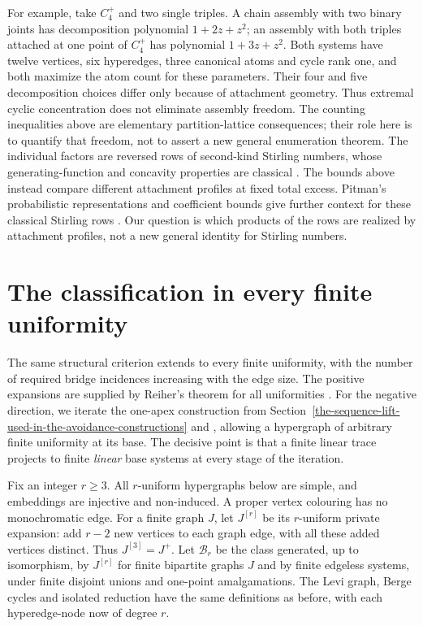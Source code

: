 \documentclass[a4paper,11pt,reqno]{amsart}
\theoremstyle{plain}
\theoremstyle{definition}
\theoremstyle{remark}
\begin{document}
For example, take $C_4^+$ and two single triples.  A chain assembly with two
binary joints has decomposition polynomial $1+2z+z^2$; an assembly with both
triples attached at one point of $C_4^+$ has polynomial $1+3z+z^2$.
Both systems have twelve vertices, six hyperedges, three canonical atoms
and cycle rank one, and both maximize the atom count for these parameters.
Their four and five decomposition choices differ only because of attachment
geometry.  Thus extremal cyclic concentration does not eliminate assembly
freedom.  The counting inequalities above are elementary partition-lattice
consequences; their role here is to quantify that freedom, not to assert a
new general enumeration theorem.
The individual factors are reversed rows of second-kind Stirling numbers,
whose generating-function and concavity properties are classical
\citep{lieb1968}.  The bounds above instead compare different attachment
profiles at fixed total excess.
Pitman's probabilistic representations and coefficient bounds give further
context for these classical Stirling rows \citep{pitman1997}.  Our question
is which products of the rows are realized by attachment profiles, not a
new general identity for Stirling numbers.

\section{The classification in every finite uniformity}
\label{uniform-extension}

The same structural criterion extends to every finite uniformity, with the
number of required bridge incidences increasing with the edge size.  The
positive expansions are supplied by Reiher's theorem for all uniformities
\citep[Theorem~1.2]{reiher2024}.  For the negative direction, we iterate the
one-apex construction from Section~\ref{the-sequence-lift-used-in-the-avoidance-constructions}
and \citet[Sections~3--4]{li2026}, allowing a hypergraph of arbitrary finite
uniformity at its base.  The decisive point is that a finite linear trace
projects to finite \emph{linear} base systems at every stage of the iteration.

Fix an integer $r\ge3$.  All $r$-uniform hypergraphs below are simple, and
embeddings are injective and non-induced.  A proper vertex colouring has
no monochromatic edge.  For a finite graph $J$, let
$J^{[r]}$ be its $r$-uniform private expansion: add $r-2$ new vertices to
each graph edge, with all these added vertices distinct.  Thus
$J^{[3]}=J^+$.  Let $\mathcal B_r$ be the class generated, up to isomorphism,
by $J^{[r]}$ for finite bipartite graphs $J$ and by finite edgeless systems,
under finite disjoint unions and one-point amalgamations.  The Levi graph,
Berge cycles and isolated reduction have the same definitions as before,
with each hyperedge-node now of degree $r$.
\end{document}
